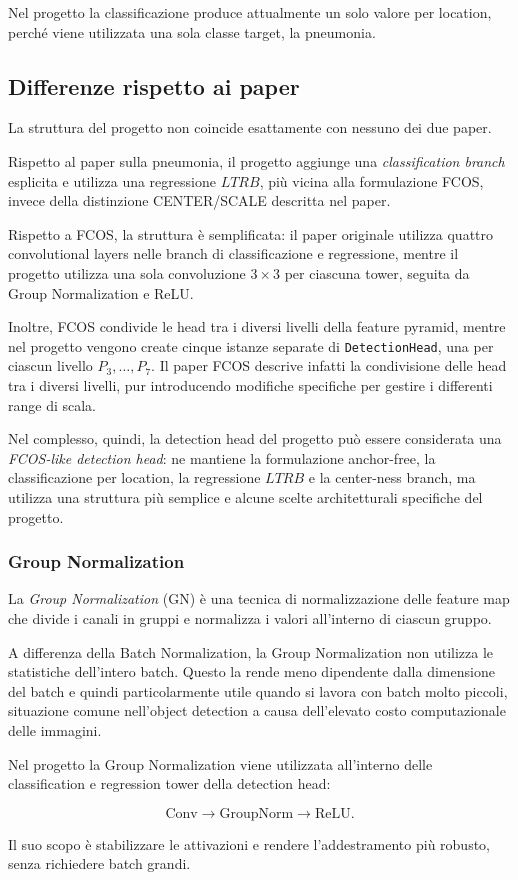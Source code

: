 Nel progetto la classificazione produce attualmente un solo valore per
location, perché viene utilizzata una sola classe target, la pneumonia.

\subsection{Differenze rispetto ai paper}

La struttura del progetto non coincide esattamente con nessuno dei due paper.

Rispetto al paper sulla pneumonia, il progetto aggiunge una
\textit{classification branch} esplicita e utilizza una regressione
$LTRB$, più vicina alla formulazione FCOS, invece della distinzione CENTER/SCALE
descritta nel paper.

Rispetto a FCOS, la struttura è semplificata: il paper originale utilizza
quattro convolutional layers nelle branch di classificazione e regressione,
mentre il progetto utilizza una sola convoluzione $3\times3$ per ciascuna
tower, seguita da Group Normalization e ReLU.

Inoltre, FCOS condivide le head tra i diversi livelli della feature pyramid,
mentre nel progetto vengono create cinque istanze separate di
\texttt{DetectionHead}, una per ciascun livello $P_3,\ldots,P_7$. Il paper
FCOS descrive infatti la condivisione delle head tra i diversi livelli, pur
introducendo modifiche specifiche per gestire i differenti range di scala.

Nel complesso, quindi, la detection head del progetto può essere considerata
una \textit{FCOS-like detection head}: ne mantiene la formulazione
anchor-free, la classificazione per location, la regressione $LTRB$ e la
center-ness branch, ma utilizza una struttura più semplice e alcune scelte
architetturali specifiche del progetto.
\subsubsection{Group Normalization}

La \textit{Group Normalization} (GN) è una tecnica di normalizzazione delle
feature map che divide i canali in gruppi e normalizza i valori all'interno di
ciascun gruppo.

A differenza della Batch Normalization, la Group Normalization non utilizza le
statistiche dell'intero batch. Questo la rende meno dipendente dalla
dimensione del batch e quindi particolarmente utile quando si lavora con batch
molto piccoli, situazione comune nell'object detection a causa dell'elevato
costo computazionale delle immagini.

Nel progetto la Group Normalization viene utilizzata all'interno delle
classification e regression tower della detection head:

\[
\text{Conv}
\rightarrow
\text{GroupNorm}
\rightarrow
\text{ReLU}.
\]

Il suo scopo è stabilizzare le attivazioni e rendere l'addestramento più
robusto, senza richiedere batch grandi.